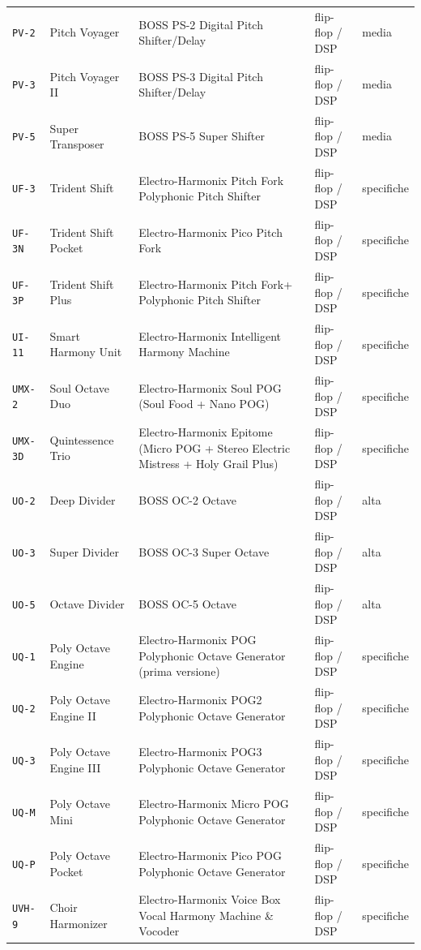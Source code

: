 \begin{xltabular}{\linewidth}{@{}l l X l l@{}}
\texttt{PV-2} & Pitch Voyager & BOSS PS-2 Digital Pitch Shifter/Delay & flip-flop / DSP & media\\
\texttt{PV-3} & Pitch Voyager II & BOSS PS-3 Digital Pitch Shifter/Delay & flip-flop / DSP & media\\
\texttt{PV-5} & Super Transposer & BOSS PS-5 Super Shifter & flip-flop / DSP & media\\
\texttt{UF-3} & Trident Shift & Electro-Harmonix Pitch Fork Polyphonic Pitch Shifter & flip-flop / DSP & specifiche\\
\texttt{UF-3N} & Trident Shift Pocket & Electro-Harmonix Pico Pitch Fork & flip-flop / DSP & specifiche\\
\texttt{UF-3P} & Trident Shift Plus & Electro-Harmonix Pitch Fork+ Polyphonic Pitch Shifter & flip-flop / DSP & specifiche\\
\texttt{UI-11} & Smart Harmony Unit & Electro-Harmonix Intelligent Harmony Machine & flip-flop / DSP & specifiche\\
\texttt{UMX-2} & Soul Octave Duo & Electro-Harmonix Soul POG (Soul Food + Nano POG) & flip-flop / DSP & specifiche\\
\texttt{UMX-3D} & Quintessence Trio & Electro-Harmonix Epitome (Micro POG + Stereo Electric Mistress + Holy Grail Plus) & flip-flop / DSP & specifiche\\
\texttt{UO-2} & Deep Divider & BOSS OC-2 Octave & flip-flop / DSP & alta\\
\texttt{UO-3} & Super Divider & BOSS OC-3 Super Octave & flip-flop / DSP & alta\\
\texttt{UO-5} & Octave Divider & BOSS OC-5 Octave & flip-flop / DSP & alta\\
\texttt{UQ-1} & Poly Octave Engine & Electro-Harmonix POG Polyphonic Octave Generator (prima versione) & flip-flop / DSP & specifiche\\
\texttt{UQ-2} & Poly Octave Engine II & Electro-Harmonix POG2 Polyphonic Octave Generator & flip-flop / DSP & specifiche\\
\texttt{UQ-3} & Poly Octave Engine III & Electro-Harmonix POG3 Polyphonic Octave Generator & flip-flop / DSP & specifiche\\
\texttt{UQ-M} & Poly Octave Mini & Electro-Harmonix Micro POG Polyphonic Octave Generator & flip-flop / DSP & specifiche\\
\texttt{UQ-P} & Poly Octave Pocket & Electro-Harmonix Pico POG Polyphonic Octave Generator & flip-flop / DSP & specifiche\\
\texttt{UVH-9} & Choir Harmonizer & Electro-Harmonix Voice Box Vocal Harmony Machine \& Vocoder & flip-flop / DSP & specifiche\\

\end{xltabular}
